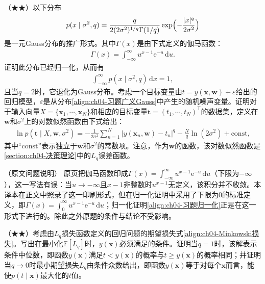 \documentclass[../../main.tex]{subfiles}
\begin{document}
\begin{exercise}\label{exercise:ch04-11}
（★★）以下分布
\begin{align}
  p(x\mid\sigma^2,q)=\frac{q}{2(2\sigma^2)^{1/q}\Gamma(1/q)}\exp\Bigl(-\frac{|x|^q}{2\sigma^2}\Bigr)
  \label{align:ch04-习题广义Gauss}
\end{align}
是一元Gauss分布的推广形式。其中$\Gamma(x)$是由下式定义的伽马函数：
\begin{align}
  \Gamma(x)=\int_{-\infty}^{\infty}u^{x-1}\mathrm{e}^{-u}\,\mathrm{d}u .
  \label{align:ch04-习题伽马函数}
\end{align}
证明此分布已经归一化，从而有
\begin{align}
  \int_{-\infty}^{\infty}p(x\mid\sigma^2,q)\,\mathrm{d}x=1,
  \label{align:ch04-习题归一化}
\end{align}
且当$q=2$时，它退化为Gauss分布。考虑一个目标变量由$t=y(\boldsymbol{x},\boldsymbol{w})+\varepsilon$给出的回归模型，$\varepsilon$是从分布\eqref{align:ch04-习题广义Gauss}中产生的随机噪声变量。证明对于输入向量$X=\{\boldsymbol{x}_1,\cdots,\boldsymbol{x}_N\}$和相应的目标变量$\boldsymbol{t}=(t_1,\cdots,t_N)^{\mathsf{T}}$的数据集，定义在$\boldsymbol{w}$和$\sigma^2$上的对数似然函数由下式给出：
\begin{align}
  \ln p(\boldsymbol{t}\mid X,\boldsymbol{w},\sigma^2)=-\frac{1}{2\sigma^2}\sum_{n=1}^{N}\bigl|y(\boldsymbol{x}_n,\boldsymbol{w})-t_n\bigr|^q-\frac{N}{q}\ln(2\sigma^2)+\text{const},
  \label{align:ch04-习题广义对数似然}
\end{align}
其中“const”表示独立于$\boldsymbol{w}$和$\sigma^2$的常数项。注意，作为$\boldsymbol{w}$的函数，该对数似然函数是\cref{section:ch04-决策理论}中的$L_q$误差函数。
\end{exercise}

\begin{remark}（原文问题说明）
原页把伽马函数印成$\Gamma(x)=\int_{-\infty}^{\infty}u^{x-1}\mathrm{e}^{-u}\,\mathrm{d}u$（下限为$-\infty$），这一写法有误：当$u\to-\infty$且$x-1$非整数时$u^{x-1}$无定义，该积分并不收敛。本译本在正文中照录了这一印刷形式，但在归一化证明中采用了下限为$0$的标准定义，即$\Gamma(x)=\int_{0}^{\infty}u^{x-1}\mathrm{e}^{-u}\,\mathrm{d}u$；归一化证明\eqref{align:ch04-习题归一化}正是在这一形式下进行的。除此之外原题的条件与结论不受影响。
\end{remark}

\begin{exercise}\label{exercise:ch04-12}
（★★）考虑由$L_q$损失函数定义的回归问题的期望损失式\eqref{align:ch04-Minkowski损失}。写出在最小化$\mathbb{E}[L_q]$时，$y(\boldsymbol{x})$必须满足的条件。证明当$q=1$时，该解表示条件中位数，即函数$y(\boldsymbol{x})$满足$t<y(\boldsymbol{x})$的概率与$t\geqslant y(\boldsymbol{x})$的概率相同；并证明当$q\to0$时最小期望损失$L_q$由条件众数给出，即函数$y(\boldsymbol{x})$等于对每个$\boldsymbol{x}$而言，能使$p(t\mid\boldsymbol{x})$最大化的$t$值。
\end{exercise}
\end{document}

